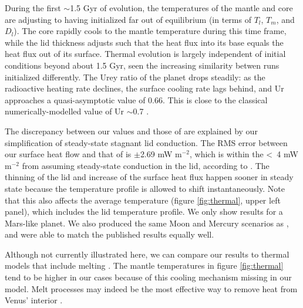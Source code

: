During the first $\sim$1.5 Gyr of evolution, the temperatures of the mantle and core are adjusting to having initialized far out of equilibrium (in terms of $T_l$, $T_m$, and $D_l$). The core rapidly cools to the mantle temperature during this time frame, while the lid thickness adjusts such that the heat flux into its base equals the heat flux out of its surface. Thermal evolution is largely independent of initial conditions beyond about 1.5 Gyr, seen the increasing similarity betwen runs initialized differently. The Urey ratio of the planet drops steadily: as the radioactive heating rate declines, the surface cooling rate lags behind, and Ur approaches a quasi-asymptotic value of 0.66. This is close to the classical numerically-modelled value of Ur $\sim$0.7 \citep{Schubert1980, McKenzie1981}.


The discrepancy between our values and those of \citet{Thiriet2019} are explained by our simplification of steady-state stagnant lid conduction. The RMS error between our surface heat flow and that of  \citet{Thiriet2019} is $\pm$2.69 mW m$^{-2}$, which is within the \textless~4 mW m$^{-2}$ from assuming steady-state conduction in the lid, according to \citet{Thiriet2019}. The thinning of the lid and increase of the surface heat flux happen sooner in steady state because the temperature profile is allowed to shift instantaneously. Note that this also affects the average temperature (figure \ref{fig:thermal}, upper left panel), which includes the lid temperature profile. We only show results for a Mars-like planet. We also produced the same Moon and Mercury scenarios as \citet{Thiriet2019}, and were able to match the published results equally well.  



Although not currently illustrated here, we can compare our results to thermal models that include melting \citep[e.g.,][]{Hauck2002, Kite2009}. The mantle temperatures in figure \ref{fig:thermal} tend to be higher in our cases because of this cooling mechanism missing in our model. Melt processes may indeed be the most effective way to remove heat from Venus' interior \citep{Armann2012}.

